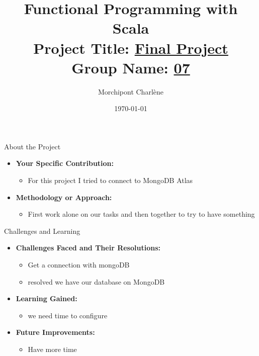 \documentclass[serif, aspectratio=169]{beamer}
\title[Project Presentation]{Functional Programming with Scala \\ { \large Project Title: \underline{ Final Project \hspace{2cm}}}\\ {\small Group Name: \underline{ 07 \hspace{2cm} }}}
\author{Morchipont Charlène}
\institute{ IG5\_Polytech}
\date{\small \today}
\begin{document}
\begin{frame}
    \titlepage
\end{frame}

\begin{frame}{About the Project}
    \begin{itemize}
        \item \textbf{Your Specific Contribution:}
        \begin{itemize}
            \item For this project I tried  to connect to MongoDB Atlas
        \end{itemize}
        \medskip
        \item \textbf{Methodology or Approach:}
        \begin{itemize}
            \item First work alone on our tasks and then together to try to have something
        \end{itemize}

    \end{itemize}
\end{frame}

\begin{frame}{Challenges and Learning}
    \begin{itemize}
        \item \textbf{Challenges Faced and Their Resolutions:}
        \begin{itemize}
            \item Get a connection with mongoDB
            \item  resolved we have our database on MongoDB
        \end{itemize}
        \medskip
        \item \textbf{Learning Gained:}
        \begin{itemize}
            \item we need time to configure 
        \end{itemize}
        \medskip
        \item \textbf{Future Improvements:}
        \begin{itemize}
            \item Have more time
        \end{itemize}
    \end{itemize}
\end{frame}
\end{document}
